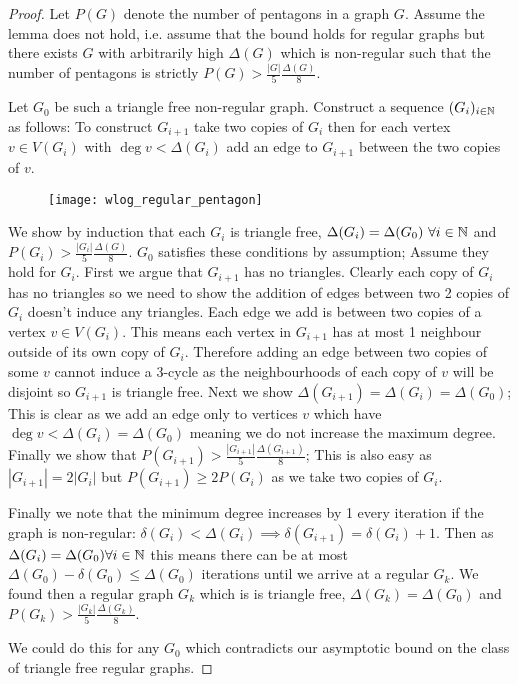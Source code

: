 \begin{proof}
    Let $P(G)$ denote the number of pentagons in a graph $G$.
    Assume the lemma does not hold, i.e. assume that the bound holds for regular graphs but there
    exists $G$ with arbitrarily high $\Delta(G)$ which is non-regular such that the number
    of pentagons is strictly $P(G) > \frac{|G|}{5}\frac{\Delta(G)}{8}$.

    Let $G_0$ be such a triangle free non-regular graph. Construct a sequence $(G_i)_{i\in\mathbb{N}}$ as
    follows: To construct $G_{i+1}$ take two copies of $G_i$ then for each vertex $v\in V(G_i)$
    with $\deg v < \Delta(G_i)$ add an edge to $G_{i+1}$ between the two copies of $v$.

    \begin{figure}[!ht]
        \centering
        \texttt{[image: wlog\_regular\_pentagon]}
    \end{figure}

    We show by induction that each $G_i$ is triangle free, $\Delta(G_i)=\Delta(G_0)\ \forall i\in\N$
    and $P(G_i) > \frac{|G_i|}{5}\frac{\Delta(G)}{8}$. $G_0$ satisfies these conditions
    by assumption; Assume they hold for $G_i$. First we argue that $G_{i+1}$ has no
    triangles. Clearly each copy of $G_i$ has no triangles so we need to show the
    addition of edges between two 2 copies of $G_i$ doesn't induce any triangles.
    Each edge we add is between two copies of a vertex $v\in V(G_i)$. This means
    each vertex in $G_{i+1}$ has at most 1 neighbour outside of its own copy of $G_i$.
    Therefore adding an edge between two copies of some $v$ cannot induce a 3-cycle
    as the neighbourhoods of each copy of $v$ will be disjoint so $G_{i+1}$ is
    triangle free. Next we show $\Delta(G_{i+1})=\Delta(G_i)=\Delta(G_0)$; This is
    clear as we add an edge only to vertices $v$ which have $\deg v < \Delta(G_i)=\Delta(G_0)$
    meaning we do not increase the maximum degree.
    Finally we show that $P(G_{i+1}) > \frac{|G_{i+1}|}{5}\frac{\Delta(G_{i+1})}{8}$;
    This is also easy as $|G_{i+1}|=2|G_i|$ but $P(G_{i+1}) \geq 2 P(G_i)$ as we take
    two copies of $G_i$.

    Finally we note that the minimum degree increases by 1 every iteration if the
    graph is non-regular: $\delta(G_i) < \Delta(G_i) \implies \delta(G_{i+1})=\delta(G_i) + 1$.
    Then as $\Delta(G_i)=\Delta(G_0)\forall i\in\mathbb{N}$ this means there can be at most
    $\Delta(G_0)-\delta(G_0) \leq \Delta(G_0)$ iterations until we arrive at a regular
    $G_k$. We found then a regular graph $G_k$ which is is triangle free, $\Delta(G_k)=\Delta(G_0)$
    and $P(G_k) > \frac{|G_k|}{5}\frac{\Delta(G_k)}{8}$.

    We could do this for any $G_0$ which contradicts our asymptotic bound on the
    class of triangle free regular graphs.
\end{proof}
